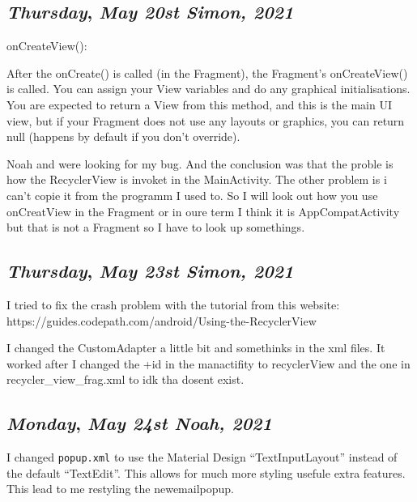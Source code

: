 \begin{center}
\section*{\month}
\end{center}

\def\day{\textit{May 20st Simon, 2021}}
\def\weekday{\textit{Thursday}}
\subsection*{\weekday, \day}

onCreateView():

After the onCreate() is called (in the Fragment), the Fragment's onCreateView() is called. You can assign your View variables and do any graphical initialisations. You are expected to return a View from this method, and this is the main UI view, but if your Fragment does not use any layouts or graphics, you can return null (happens by default if you don't override).

Noah and were looking for my bug. And the conclusion was that the proble is how the RecyclerView is invoket in the MainActivity. The other problem is i can't 
copie it from the programm I used to. So I will look out how you use onCreatView in the Fragment or in oure term I think it is AppCompatActivity but that is not a Fragment so 
I have to look up somethings. 



\def\day{\textit{May 23st Simon, 2021}}
\def\weekday{\textit{Thursday}}
\subsection*{\weekday, \day}

I tried to fix the crash problem with the tutorial from this website:
https://guides.codepath.com/android/Using-the-RecyclerView

I changed the CustomAdapter a little bit and somethinks in the xml files.
It worked after I changed the +id in the manactifity to recyclerView and the one in recycler_view_frag.xml to idk tha dosent exist.


\def\day{\textit{May 24st Noah, 2021}}
\def\weekday{\textit{Monday}}
\subsection*{\weekday, \day}

I changed \texttt{popup.xml} to use the Material Design ``TextInputLayout'' instead of the default ``TextEdit''. This allows for much more styling usefule extra features. This lead to me restyling the newemailpopup.\\


